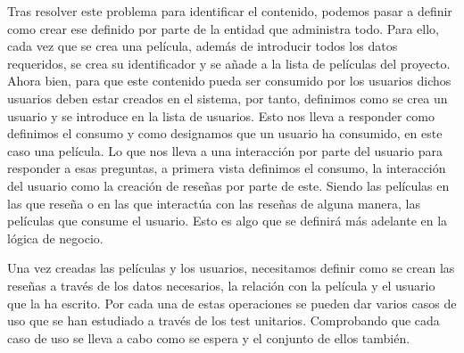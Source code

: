 Tras resolver este problema para identificar el contenido, podemos pasar a definir como crear ese 
definido por parte de la entidad que administra todo. Para ello, cada vez que se crea una película, 
además de introducir todos los datos requeridos, se crea su identificador y se añade a la lista de 
películas del proyecto. Ahora bien, para que este contenido pueda ser consumido por los usuarios dichos 
usuarios deben estar creados en el sistema, por tanto, definimos como se crea un usuario y se introduce 
en la lista de usuarios. Esto nos lleva a responder como definimos el consumo y como designamos que un 
usuario ha consumido, en este caso una película. Lo que nos lleva a una interacción por parte del 
usuario para responder a esas preguntas, a primera vista definimos el consumo, la interacción del 
usuario como la creación de reseñas por parte de este. Siendo las películas en las que reseña o en las 
que interactúa con las reseñas de alguna manera, las películas que consume el usuario. Esto es algo que 
se definirá más adelante en la lógica de negocio. 

Una vez creadas las películas y los usuarios, necesitamos definir como se crean las reseñas a través de 
los datos necesarios, la relación con la película y el usuario que la ha escrito.
Por cada una de estas operaciones se pueden dar varios casos de uso que se han estudiado a través de 
los test unitarios. Comprobando que cada caso de uso se lleva a cabo como se espera y el conjunto de 
ellos también. 

